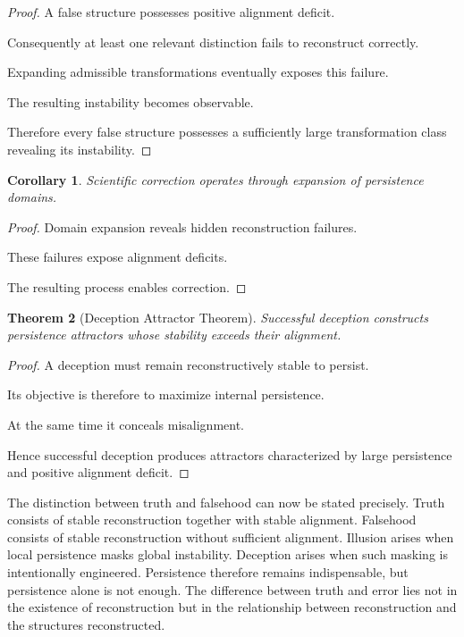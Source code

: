 \documentclass[12pt,oneside]{article}
\newtheorem{theorem}{Theorem}[section] \newtheorem{lemma}[theorem]{Lemma} \newtheorem{proposition}[theorem]{Proposition} \newtheorem{corollary}[theorem]{Corollary}
\theoremstyle{definition}
\begin{document}
\begin{proof}

A false structure possesses positive alignment deficit.

Consequently at least one relevant distinction fails to reconstruct correctly.

Expanding admissible transformations eventually exposes this failure.

The resulting instability becomes observable.

Therefore every false structure possesses a sufficiently large transformation class revealing its instability.

\end{proof}

\begin{corollary}

Scientific correction operates through expansion of persistence domains.

\end{corollary}

\begin{proof}

Domain expansion reveals hidden reconstruction failures.

These failures expose alignment deficits.

The resulting process enables correction.

\end{proof}

\begin{theorem}[Deception Attractor Theorem]

Successful deception constructs persistence attractors whose stability exceeds their alignment.

\end{theorem}

\begin{proof}

A deception must remain reconstructively stable to persist.

Its objective is therefore to maximize internal persistence.

At the same time it conceals misalignment.

Hence successful deception produces attractors characterized by large persistence and positive alignment deficit.

\end{proof}

The distinction between truth and falsehood can now be stated precisely. Truth consists of stable reconstruction together with stable alignment. Falsehood consists of stable reconstruction without sufficient alignment. Illusion arises when local persistence masks global instability. Deception arises when such masking is intentionally engineered. Persistence therefore remains indispensable, but persistence alone is not enough. The difference between truth and error lies not in the existence of reconstruction but in the relationship between reconstruction and the structures reconstructed.
\end{document}
